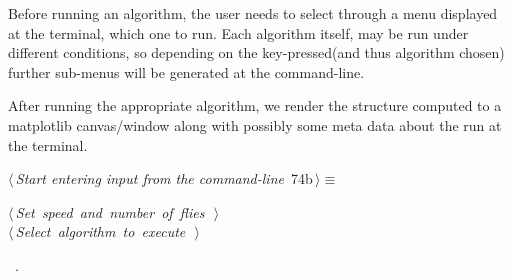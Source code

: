 \documentclass[11.5pt]{report}
\begin{document}
\vspace{-0.8cm}\newchunk Before running an algorithm, the user needs to select through 
a menu displayed at the terminal, which one to run. Each algorithm itself, may be 
run under different conditions, so depending on the key-pressed(and thus algorithm chosen) 
further sub-menus will be generated at the command-line. 

After running the appropriate algorithm, we render the structure computed to a matplotlib canvas/window
along with possibly some meta data about the run at the terminal. 


\begin{flushleft} \small\label{scrap103}\raggedright\small
{} $\langle\,${\itshape Start entering input from the command-line}\nobreak\ {\footnotesize {74b}}$\,\rangle\equiv$
\vspace{-1ex}
\begin{list}{}{} \item
\mbox{}\verb@@\hbox{$\langle\,${\itshape Set speed and number of flies}\nobreak\ {\footnotesize {}}$\,\rangle$}\verb@@\\
\mbox{}\verb@@\hbox{$\langle\,${\itshape Select algorithm to execute}\nobreak\ {\footnotesize {}}$\,\rangle$}\verb@@\\
\mbox{}\verb@@{\NWsep}
\end{list}
\vspace{-1.5ex}
\footnotesize
\begin{list}{}{\setlength{\itemsep}{-\parsep}\setlength{\itemindent}{-\leftmargin}}
\item \NWtxtMacroRefIn\ .

\item{}
\end{list}
\vspace{4ex}
\end{flushleft}
\end{document}
